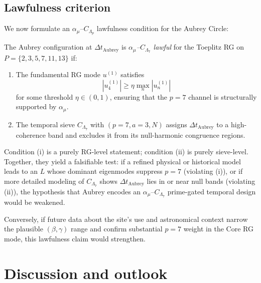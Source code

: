 \documentclass[11pt]{article}
\begin{document}
\subsection{Lawfulness criterion}

We now formulate an $\alpha_\mu$--$C_{\Lambda_p}$ lawfulness condition for the Aubrey Circle:

\begin{definition}
The Aubrey configuration at $\Delta t_{\mathrm{Aubrey}}$ is \emph{$\alpha_\mu$--$C_{\Lambda_7}$ lawful} for the Toeplitz RG on $P = \{2,3,5,7,11,13\}$ if:
\begin{enumerate}[label=(\roman*)]
    \item The fundamental RG mode $u^{(1)}$ satisfies
    \[
        |u^{(1)}_4| \ge \eta \max_n |u^{(1)}_n|
    \]
    for some threshold $\eta \in (0,1)$, ensuring that the $p=7$ channel is structurally supported by $\alpha_\mu$.
    \item The temporal sieve $C_{\Lambda_7}$ with $(p=7,a=3,N)$ assigns $\Delta t_{\mathrm{Aubrey}}$ to a high-coherence band and excludes it from its null-harmonic congruence regions.
\end{enumerate}
\end{definition}

Condition (i) is a purely RG-level statement; condition (ii) is purely sieve-level.
Together, they yield a falsifiable test:
if a refined physical or historical model leads to an $L$ whose dominant eigenmodes suppress $p=7$ (violating (i)), or if more detailed modeling of $C_{\Lambda_7}$ shows $\Delta t_{\mathrm{Aubrey}}$ lies in or near null bands (violating (ii)), the hypothesis that Aubrey encodes an $\alpha_\mu$--$C_{\Lambda_7}$ prime-gated temporal design would be weakened.

Conversely, if future data about the site's use and astronomical context narrow the plausible $(\beta,\gamma)$ range and confirm substantial $p=7$ weight in the Core RG mode, this lawfulness claim would strengthen.

\section{Discussion and outlook}
\end{document}
